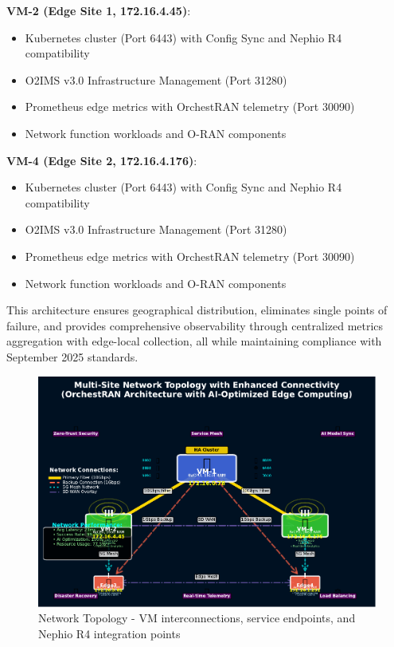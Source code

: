 \textbf{VM-2 (Edge Site 1, 172.16.4.45)}:
\begin{itemize}
\item Kubernetes cluster (Port 6443) with Config Sync and Nephio R4 compatibility
\item O2IMS v3.0 Infrastructure Management (Port 31280)
\item Prometheus edge metrics with OrchestRAN telemetry (Port 30090)
\item Network function workloads and O-RAN components
\end{itemize}

\textbf{VM-4 (Edge Site 2, 172.16.4.176)}:
\begin{itemize}
\item Kubernetes cluster (Port 6443) with Config Sync and Nephio R4 compatibility
\item O2IMS v3.0 Infrastructure Management (Port 31280)
\item Prometheus edge metrics with OrchestRAN telemetry (Port 30090)
\item Network function workloads and O-RAN components
\end{itemize}

This architecture ensures geographical distribution, eliminates single points of failure, and provides comprehensive observability through centralized metrics aggregation with edge-local collection, all while maintaining compliance with September 2025 standards.

\begin{figure}[htbp]
\centering
\includegraphics[width=\columnwidth]{figures/figure5_network_topology.pdf}
\caption{Network Topology - VM interconnections, service endpoints, and Nephio R4 integration points}
\label{fig:topology}
\end{figure}

